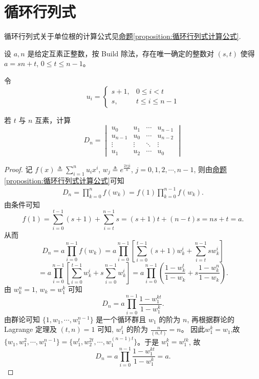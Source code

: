 \documentclass[../../main.tex]{subfiles}
\begin{document}
\section{循环行列式}

循环行列式关于单位根的计算公式见\hyperref[proposition:循环行列式计算公式]{命题\ref{proposition:循环行列式计算公式}}.

\begin{example}
设 $a, n$ 是给定互素正整数，按 Build 除法，存在唯一确定的整数对 $(s, t)$ 使得 $a = sn + t$, $0 \leqslant  t \leqslant  n - 1$。

令
\[u_i = 
\begin{cases} 
s + 1, & 0 \leqslant  i < t \\
s, & t \leqslant  i \leqslant  n - 1 
\end{cases}\]

若 $t$ 与 $n$ 互素，计算
\[D_n =
\begin{vmatrix}
u_0 & u_1 & \cdots & u_{n-1} \\
u_{n-1} & u_0 & \cdots & u_{n-2} \\
\vdots & \vdots & \ddots & \vdots \\
u_1 & u_2 & \cdots & u_0
\end{vmatrix}\]
\end{example}
\begin{proof}
记 $f(x) \triangleq \sum_{i=1}^n u_i x^i$, $w_j \triangleq e^{\frac{2\pi j \mathrm{i} }{n}}$, $j=0,1,2,\cdots,n-1$, 则由\hyperref[proposition:循环行列式计算公式]{命题\ref{proposition:循环行列式计算公式}}可知
\begin{align*}
D_n=\prod_{k=0}^n{f\left( w_k \right)}=f\left( 1 \right) \prod_{k=0}^{n-1}{f\left( w_k \right)}.
\end{align*}
由条件可知
\[
f(1) = \sum_{i=0}^{t-1} (s+1) + \sum_{i=t}^{n-1} s = (s+1)t + (n-t)s = ns + t = a.
\]
从而
\[
D_n = a \prod_{i=0}^{n-1} f(w_k) = a \prod_{i=0}^{n-1} \left[ \sum_{i=0}^{t-1} (s+1) w_{k}^{i} + \sum_{i=t}^{n-1} s w_{k}^{i} \right]
\]
\[
= a \prod_{i=0}^{n-1} \left[ \sum_{i=0}^{t-1} w_{k}^{i} + s \sum_{i=0}^{n-1} w_{k}^{i} \right] = a \prod_{i=0}^{n-1} \left( \frac{1-w_{k}^{t}}{1-w_k} + s \frac{1-w_{k}^{n}}{1-w_k} \right).
\]
由 $w_{k}^{n} = 1$, $w_k = w_{1}^{k}$ 可知
\[
D_n = a \prod_{i=0}^{n-1} \frac{1-w_{1}^{kt}}{1-w_{1}^{k}}.
\]
由群论可知 $\{1, w_1, \cdots, w_{1}^{n-1}\}$ 是一个循环群且 $w_1$ 的阶为 $n$, 再根据群论的 Lagrange 定理及 $(t, n) = 1$ 可知, $w_{1}^{t}$ 的阶为 $\frac{n}{(n,t)} = n$。  
因此$w_1^k=w_1$,故$\{w_1, w_{1}^{2}, \cdots, w_{1}^{n-1}\} = \{w_{1}^{t}, w_{2}^{2t}, \cdots, w_{1}^{(n-1)t}\}$。于是 $w_{1}^{k} = w_{1}^{tk}$, 故
\[
D_n = a \prod_{i=0}^{n-1} \frac{1-w_{1}^{kt}}{1-w_{1}^{k}} = a.
\]
\end{proof}
\end{document}
